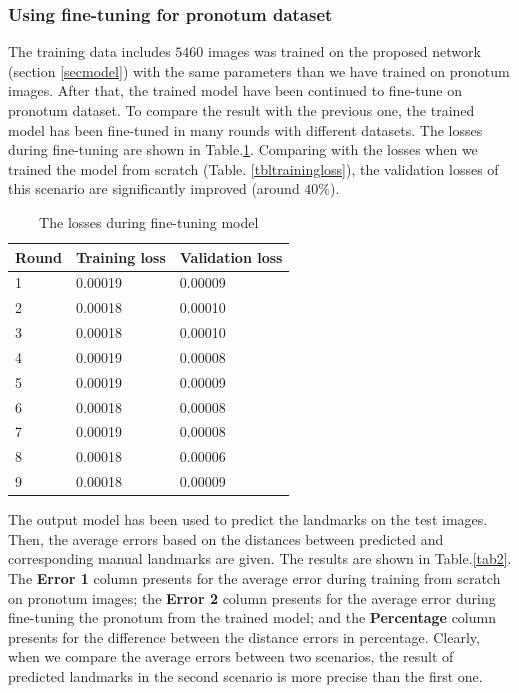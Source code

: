 \documentclass[10pt]{article}
\begin{document}
\subsubsection{Using fine-tuning for pronotum dataset}
The training data includes $5460$ images was trained on the proposed network (section \ref{secmodel}) with the same parameters than we have trained on pronotum images. After that, the trained model have been continued to fine-tune on pronotum dataset. To compare the result with the previous one, the trained model has been fine-tuned in many rounds with different datasets. The losses during fine-tuning are shown in Table.\ref{tblfinetuningloss}. Comparing with the losses when we trained the model from scratch (Table. \ref{tbltrainingloss}), the validation losses of this scenario are significantly improved (around $40\%$).
\begin{table}[h!]
	\centering
	\begin{tabular}{l l l}
	Round & Training loss & Validation loss \\ \hline
	1 & 0.00019 & 0.00009  \\ \hline
	2 & 0.00018 & 0.00010 \\ \hline
	3 & 0.00018 & 0.00010 \\ \hline
	4 & 0.00019 & 0.00008 \\ \hline
	5 & 0.00019 & 0.00009 \\ \hline
	6 & 0.00018 & 0.00008 \\ \hline
	7 & 0.00019 & 0.00008 \\ \hline
	8 & 0.00018 & 0.00006 \\ \hline
	9 & 0.00018 & 0.00009 \\ \hline
	\end{tabular}
	\caption{The losses during fine-tuning model}
	\label{tblfinetuningloss}
\end{table}

The output model has been used to predict the landmarks on the test images. Then, the average errors based on the distances between predicted and corresponding manual landmarks are given. The results are shown in Table.\ref{tab2}. The \textbf{Error 1} column presents for the average error during training from scratch on pronotum images; the \textbf{Error 2} column presents for the average error during fine-tuning the pronotum from the trained model; and the \textbf{Percentage} column presents for the difference between the distance errors in percentage. Clearly, when we compare the average errors between two scenarios, the result of predicted landmarks in the second scenario is more precise than the first one.
\end{document}

